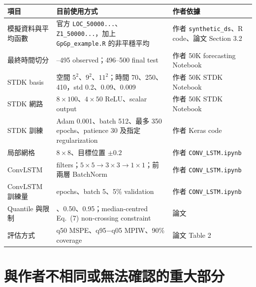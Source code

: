 \documentclass[12pt,a4paper]{article}
\begin{document}
\small
\begin{longtable}{>{\raggedright\arraybackslash}p{}
                  >{\raggedright\arraybackslash}p{}
                  >{\raggedright\arraybackslash}p{}}
\toprule
項目 & 目前使用方式 & 作者依據 \\
\midrule
\endhead
模擬資料與平均函數 & 官方 \texttt{LOC\_50000...}、\texttt{Z1\_50000...}，加上 \texttt{GpGp\_example.R} 的非平穩平均 & 作者 \texttt{synthetic\_ds}、R code、論文 Section 3.2 \\
最終時間切分 & 1--495 observed；496--500 final test & 作者 50K forecasting Notebook \\
STDK basis & 空間 $5^2$、$9^2$、$11^2$；時間 70、250、410，std 0.2、0.09、0.009 & 作者 50K STDK Notebook \\
STDK 網路 & $8\times100$、$4\times50$ ReLU、scalar output & 作者 50K STDK Notebook \\
STDK 訓練 & Adam 0.001、batch 512、最多 350 epochs、patience 30 及指定 regularization & 作者 Keras code \\
局部網格 & $8\times8$、目標位置 $\pm0.2$ & 作者 \texttt{CONV\_LSTM.ipynb} \\
ConvLSTM & 64 filters；$5\times5\rightarrow3\times3\rightarrow1\times1$；前兩層 BatchNorm & 作者 \texttt{CONV\_LSTM.ipynb} \\
ConvLSTM 訓練量 & 25 epochs、batch 5、5\% validation & 作者 \texttt{CONV\_LSTM.ipynb} \\
Quantile 與限制 & 0.05、0.50、0.95；median-centred Eq.~(7) non-crossing constraint & 論文 \\
評估方式 & q50 MSPE、q95$-$q05 MPIW、90\% coverage & 論文 Table 2 \\
\bottomrule
\end{longtable}
\normalsize

\section{與作者不相同或無法確認的重大部分}
\end{document}
